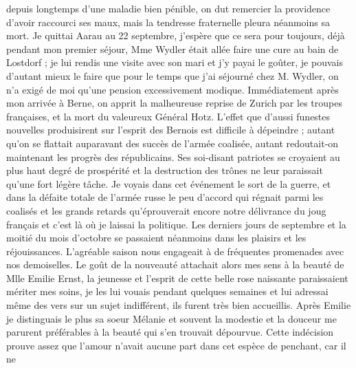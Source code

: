 \documentclass[12pt]{article}
\begin{document}
 depuis longtemps d’une maladie bien pénible,
on dut remercier la providence d’avoir raccourci ses maux, mais la tendresse fraternelle pleura
néanmoins sa mort. Je quittai Aarau au 22 septembre, j’espère que ce sera pour toujours, déjà
pendant mon premier séjour, Mme Wydler était allée faire une cure au bain de Lostdorf ; je lui
rendis une visite avec son mari et j’y payai le goûter, je pouvais d’autant mieux le faire que pour
le temps que j’ai séjourné chez M. Wydler, on n’a exigé de moi qu’une pension excessivement modique.
Immédiatement après mon arrivée à Berne, on apprit la malheureuse reprise de Zurich par les troupes
françaises, et la mort du valeureux Général Hotz. L’effet que d’aussi funestes nouvelles
produisirent sur l’esprit des Bernois est difficile à dépeindre ; autant qu’on se flattait
auparavant des succès de l’armée coalisée, autant redoutait-on maintenant les progrès des
républicains. Ses soi-disant patriotes se croyaient au plus haut degré de prospérité et la
destruction des trônes ne leur paraissait qu’une fort légère tâche. Je voyais dans cet événement le
sort de la guerre, et dans la défaite totale de l’armée russe le peu d’accord qui régnait parmi les
coalisés et les grands retards qu’éprouverait encore notre délivrance du joug français et c’est là
où je laissai la politique. Les derniers jours de septembre et la moitié du mois d’octobre se
passaient néanmoins dans les plaisirs et les réjouissances. L’agréable saison nous engageait à de
fréquentes promenades avec nos demoiselles. Le goût de la nouveauté attachait alors mes sens à la
beauté de Mlle Emilie Ernst, la jeunesse et l’esprit de cette belle rose naissante paraissaient
mériter mes soins, je les lui vouais pendant quelques semaines et lui adressai même des vers sur un
sujet indifférent, ils furent très bien accueillis. Après Emilie je distinguais le plus sa soeur
Mélanie et souvent la modestie et la douceur me parurent préférables à la beauté qui s’en trouvait
dépourvue. Cette indécision prouve assez que l’amour n’avait aucune part dans cet espèce de
penchant, car il ne
\end{document}

